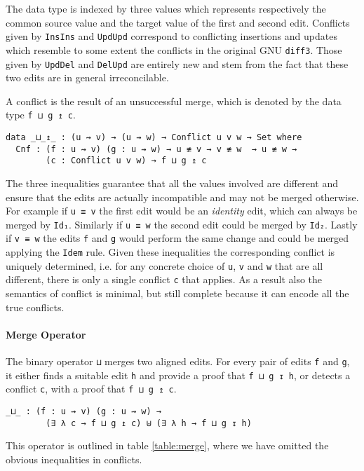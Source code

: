 \documentclass[preprint]{sigplanconf}
\begin{document}
	The data type is indexed by three values which represents respectively
	the common source value and the target value of the first and second
	edit.	Conflicts given by \texttt{InsIns} and \texttt{UpdUpd}	 correspond to 
	conflicting insertions and updates which resemble to some extent the
	conflicts in the original GNU \texttt{diff3}. Those given by \texttt{UpdDel} 
	and \texttt{DelUpd} are entirely new and stem from the fact that these two
	edits are in general irreconcilable.

	A conflict is the result of an unsuccessful merge, which is denoted
	by the data type \texttt{f ⊔ g ↥ c}.

\begin{verbatim}
data _⊔_↥_ : (u ⇝ v) → (u ⇝ w) → Conflict u v w → Set where
  Cnf : (f : u ⇝ v) (g : u ⇝ w) → u ≢ v → v ≢ w  → u ≢ w → 
        (c : Conflict u v w) → f ⊔ g ↥ c
\end{verbatim}

	The three inequalities guarantee that all the values involved are different
        and ensure that the edits are actually incompatible and may not be merged 
        otherwise. For example if \texttt{u ≡ v} the first edit would be an
        \emph{identity} edit, which can always be merged by
        \texttt{Id₁}. Similarly if \texttt{u ≡ w} the second edit could be merged
        by \texttt{Id₂}. Lastly if \texttt{v ≡ w} the edits \texttt{f} and \texttt{g}
        would perform the same change and could be merged applying the \texttt{Idem}
        rule.
        Given these inequalities the corresponding conflict is uniquely determined,
        i.e. for any concrete choice of \texttt{u}, \texttt{v} and \texttt{w} that
        are all different, there is only a single conflict \texttt{c} that applies.
	As a result also the semantics of conflict is minimal, but still complete
        because it can encode all the true conflicts.

	\paragraph{Merge Operator}
	The binary operator \texttt{⊔} merges 
	two aligned edits. For every pair of edits \texttt{f} and \texttt{g}, 
	it either finds a suitable edit \texttt{h} and provide
	a proof that \texttt{f ⊔ g ↧ h}, or detects a conflict \texttt{c}, 
	with a proof that \texttt{f ⊔ g ↥ c}.

\begin{verbatim}
_⊔_ : (f : u ⇝ v) (g : u ⇝ w) →
        (∃ λ c → f ⊔ g ↥ c) ⊎ (∃ λ h → f ⊔ g ↧ h)
\end{verbatim}
	This operator is outlined in table \ref{table:merge}, where we have
        omitted the obvious inequalities in conflicts.
\end{document}
